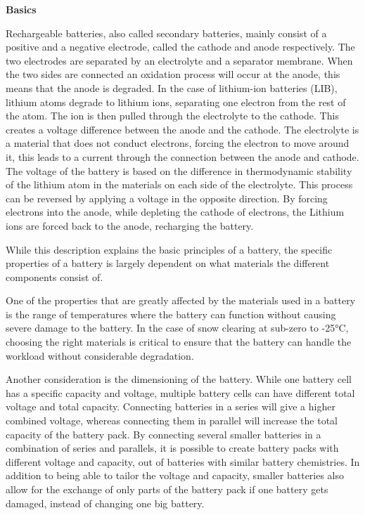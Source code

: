 \documentclass{article}
\begin{document}
\textbf{Basics}

Rechargeable batteries, also called secondary batteries, mainly consist of a positive and a negative electrode, called the cathode and anode respectively. The two electrodes are separated by an electrolyte and a separator membrane. When the two sides are connected an oxidation process will occur at the anode, this means that the anode is degraded. In the case of lithium-ion batteries (LIB), lithium atoms degrade to lithium ions, separating one electron from the rest of the atom. The ion is then pulled through the electrolyte to the cathode. This creates a voltage difference between the anode and the cathode. The electrolyte is a material that does not conduct electrons, forcing the electron to move around it, this leads to a current through the connection between the anode and cathode. The voltage of the battery is based on the difference in thermodynamic stability of the lithium atom in the materials on each side of the electrolyte. This process can be reversed by applying a voltage in the opposite direction. By forcing electrons into the anode, while depleting the cathode of electrons, the Lithium ions are forced back to the anode, recharging the battery.
 
While this description explains the basic principles of a battery, the specific properties of a battery is largely dependent on what materials the different components consist of.

One of the properties that are greatly affected by the materials used in a battery is the range of temperatures where the battery can function without causing severe damage to the battery. In the case of snow clearing at sub-zero to -25°C, choosing the right materials is critical to ensure that the battery can handle the workload without considerable degradation.
 
Another consideration is the dimensioning of the battery. While one battery cell has a specific capacity and voltage, multiple battery cells can have different total voltage and total capacity. Connecting batteries in a series will give a higher combined voltage, whereas connecting them in parallel will increase the total capacity of the battery pack. By connecting several smaller batteries in a combination of series and parallels, it is possible to create battery packs with different voltage and capacity, out of batteries with similar battery chemistries. In addition to being able to tailor the voltage and capacity, smaller batteries also allow for the exchange of only parts of the battery pack if one battery gets damaged, instead of changing one big battery.
\end{document}
